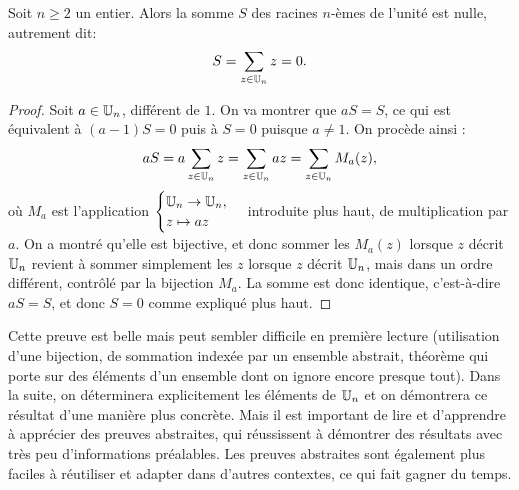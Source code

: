 \begin{proposition}
Soit $n\geq 2$ un entier. Alors la somme $S$ des racines $n$-èmes de l'unité est nulle, autrement dit:
\[ S=\sum_{z\in \mathbb{U}_n}z = 0.\]
\end{proposition}
\begin{proof}
Soit $a\in \mathbb{U}_n$, différent de $1$. On va montrer que $aS=S$, ce qui est équivalent à $(a-1)S=0$ puis à $S=0$ puisque $a\neq 1$. On procède ainsi :
\[ aS=a\sum_{z\in \mathbb{U}_n}z = \sum_{z\in \mathbb{U}_n} az = \sum_{z\in \mathbb{U}_n} M_a(z),\]
où $M_a$ est l'application $\begin{cases} \mathbb{U}_n\to \mathbb{U}_n,\\z\mapsto az\end{cases}$ introduite plus haut, de multiplication par $a$. On a montré qu'elle est bijective, et donc sommer les $M_a(z)$ lorsque $z$ décrit $\mathbb{U}_n$ revient à sommer simplement les $z$ lorsque $z$ décrit $\mathbb{U}_n$, mais dans un ordre différent, contrôlé par la bijection $M_a$. La somme est donc identique, c'est-à-dire $aS=S$, et donc $S=0$ comme expliqué plus haut.
\end{proof}

\begin{center}
\begin{mdframed}
Cette preuve est belle mais peut sembler difficile en première lecture (utilisation d'une bijection, de sommation indexée par un ensemble abstrait, théorème qui porte sur des éléments d'un ensemble dont on ignore encore presque tout). Dans la suite, on déterminera explicitement les éléments de $\mathbb{U}_n$ et on démontrera ce résultat d'une manière plus concrète. Mais il est important de lire et d'apprendre à apprécier des preuves abstraites, qui réussissent à démontrer des résultats avec très peu d'informations préalables. Les preuves abstraites sont également plus faciles à réutiliser et adapter dans d'autres contextes, ce qui fait gagner du temps.
\end{mdframed}
\end{center}


